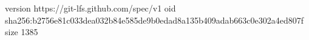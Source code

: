 version https://git-lfs.github.com/spec/v1
oid sha256:b2756e81c033dea032b84e585de9b0edad8a135b409adab663c0e302a4ed807f
size 1385
